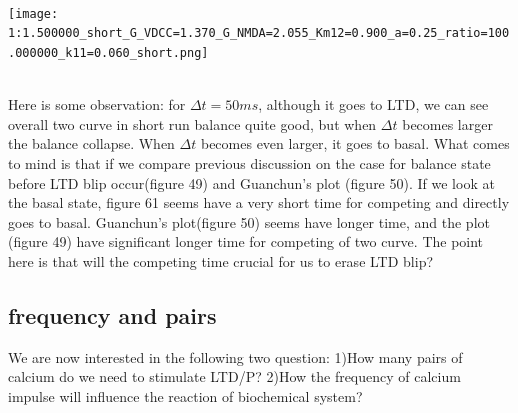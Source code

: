 \documentclass{article}
\begin{document}
\\
\begin{minipage}{\textwidth} %
    \centering
    \texttt{[image: 1:1.500000\_short\_G\_VDCC=1.370\_G\_NMDA=2.055\_Km12=0.900\_a=0.25\_ratio=100.000000\_k11=0.060\_short.png]} %
    \label{fig:a0.25}
\end{minipage}\\
Here is some observation: for $\Delta t=50ms$, although it goes to LTD, we can see overall two curve in short run balance quite good, but when $\Delta t$ becomes larger the balance collapse. When $\Delta t$ becomes even larger, it goes to basal. What comes to mind is that if we compare previous discussion on the case for balance state before LTD blip occur(figure 49) and Guanchun's plot (figure 50). If we look at the basal state, figure 61 seems have a very short time for competing and directly goes to basal. Guanchun's plot(figure 50) seems have longer time, and the plot (figure 49) have significant longer time for competing of two curve. The point here is that will the competing time crucial for us to erase LTD blip?


\subsection{frequency and pairs}
We are now interested in the following two question: 1)How many pairs of calcium do we need to stimulate LTD/P? 2)How the frequency of calcium impulse will influence the reaction of biochemical system? 
\end{document}
